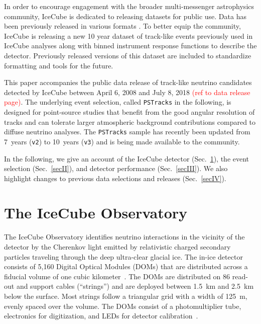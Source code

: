 \documentclass[aps,10pt,prd,twocolumn,floats,letterpaper,showpacs,nofootinbib,bibnotes,notitlepage,superscriptaddress,floatfix]{revtex4-1}
\begin{document}
In order to encourage engagement with the broader multi-messenger astrophysics community, IceCube is dedicated to releasing datasets for public use. Data has been previously released in various formats \cite{IC40data, IceCube:2013hese, IC59data, IceCube:2015numu, IceCube:2015hese4, IceCube:2016ps1, IceCube:2018, IceCube:TXS2018, IceCube:Alerts2018, IceCube:2019, IceCube:2019pst}. To better equip the community, IceCube is releasing a new 10 year dataset of track-like events previously used in IceCube analyses along with binned instrument response functions to describe the detector. Previously released versions of this dataset are included to standardize formatting and tools for the future.

This paper accompanies the public data release of track-like neutrino candidates detected by IceCube between April 6, 2008 and July 8, 2018 \textcolor{red}{(ref to data release page)}. The underlying event selection, called {\tt PSTracks} in the following, is designed for point-source studies that benefit from the good angular resolution of tracks and can tolerate larger atmospheric background contributions compared to diffuse neutrino analyses. The {\tt PSTracks} sample has recently been updated from 7~years ({\tt v2}) to 10~years ({\tt v3}) and is being made available to the community.

In the following, we give an account of the IceCube detector (Sec.~\ref{secI}), the event selection (Sec.~\ref{secII}), and detector performance (Sec.~\ref{secIII}). We also highlight changes to previous data selections and releases (Sec.~\ref{secIV}).

\section{The IceCube Observatory}\label{secI}

The IceCube Observatory identifies neutrino interactions in the vicinity of the detector by the Cherenkov light emitted by relativistic charged secondary particles traveling through the deep ultra-clear glacial ice. The in-ice detector consists of 5,160 Digital Optical Modules (DOMs) that are distributed across a fiducial volume of one cubic kilometer~\cite{Abbasi:2008aa, Abbasi:2010vc}. The DOMs are distributed on 86 read-out and support cables (``strings'') and are deployed between 1.5~km and 2.5~km below the surface. Most strings follow a triangular grid with a width of 125~m, evenly spaced over the volume. The DOMs consist of a photomultiplier tube, electronics for digitization, and LEDs for detector calibration~\cite{Abbasi:2008aa, Abbasi:2010vc}.
\end{document}
